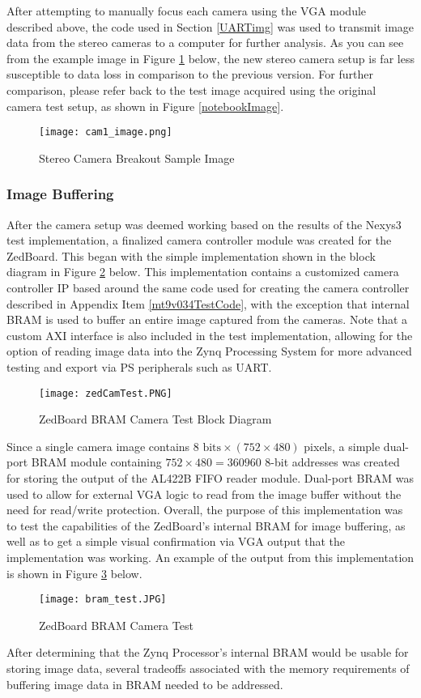 \par
After attempting to manually focus each camera using the VGA module described above, the code used in Section \ref{UARTimg} was used to transmit image data from the stereo cameras to a computer for further analysis. As you can see from the example image in Figure \ref{newBoardImage} below, the new stereo camera setup is far less susceptible to data loss in comparison to the previous version. For further comparison, please refer back to the test image acquired using the original camera test setup, as shown in Figure \ref{notebookImage}.
\begin{figure}[H] 
	\centering
	\texttt{[image: cam1\_image.png]}
	\caption{Stereo Camera Breakout Sample Image}
	\label{newBoardImage}
\end{figure}

\subsubsection{Image Buffering}
After the camera setup was deemed working based on the results of the Nexys3 test implementation, a finalized camera controller module was created for the ZedBoard. This began with the simple implementation shown in the block diagram in Figure \ref{zedCamTest} below. This implementation contains a customized camera controller IP based around the same code used for creating the camera controller described in Appendix Item \ref{mt9v034TestCode}, with the exception that internal BRAM is used to buffer an entire image captured from the cameras. Note that a custom AXI interface is also included in the test implementation, allowing for the option of reading image data into the Zynq Processing System for more advanced testing and export via PS peripherals such as UART. 
\begin{figure}[H] 
	\centering
	\texttt{[image: zedCamTest.PNG]}
	\caption{ZedBoard BRAM Camera Test Block Diagram}
	\label{zedCamTest}
\end{figure}
\par
Since a single camera image contains $8 \textrm{ bits} \times (752\times 480)$ pixels, a simple dual-port BRAM module containing $752\times480=360960$ 8-bit addresses was created for storing the output of the AL422B FIFO reader module. Dual-port BRAM was used to allow for external VGA logic to read from the image buffer without the need for read/write protection. Overall, the purpose of this implementation was to test the capabilities of the ZedBoard's internal BRAM for image buffering, as well as to get a simple visual confirmation via VGA output that the implementation was working. An example of the output from this implementation is shown in Figure \ref{bramCamTest} below. 
\begin{figure}[H] 
	\centering
	\texttt{[image: bram\_test.JPG]}
	\caption{ZedBoard BRAM Camera Test}
	\label{bramCamTest}
\end{figure}
\par
After determining that the Zynq Processor's internal BRAM would be usable for storing image data, several tradeoffs associated with the memory requirements of buffering image data in BRAM needed to be addressed. 

